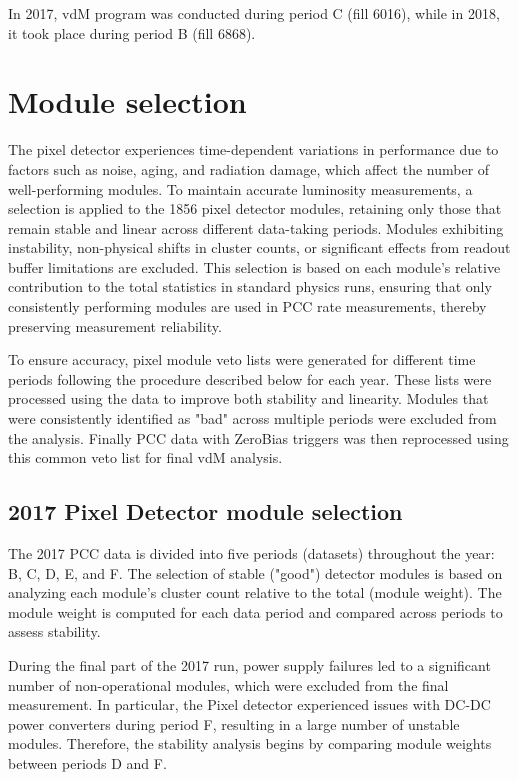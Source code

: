 In 2017, vdM program was conducted during period C (fill 6016), while in 2018, it took place during period B (fill 6868).


\section{Module selection}


The pixel detector experiences time-dependent variations in performance due to factors such as noise, aging, and radiation damage, which affect the number of well-performing modules. To maintain accurate luminosity measurements, a selection is applied to the 1856 pixel detector modules, retaining only those that remain stable and linear across different data-taking periods. Modules exhibiting instability, non-physical shifts in cluster counts, or significant effects from readout buffer limitations are excluded. This selection is based on each module’s relative contribution to the total statistics in standard physics runs, ensuring that only consistently performing modules are used in PCC rate measurements, thereby preserving measurement reliability.

To ensure accuracy, pixel module veto lists were generated for different time periods following the procedure described below for each year. These lists were processed using the data to improve both stability and linearity. Modules that were consistently identified as "bad" across multiple periods were excluded from the analysis. Finally PCC data with ZeroBias triggers was then reprocessed using this common veto list for final vdM analysis.

\subsection{2017 Pixel Detector module selection}
\label{sec:pcc_perf_moduleselection_2017}



The 2017 PCC data is divided into five periods (datasets) throughout the year: B, C, D, E, and F. The selection of stable ("good") detector modules is based on analyzing each module's cluster count relative to the total (module weight). The module weight is computed for each data period and compared across periods to assess stability.

During the final part of the 2017 run, power supply failures led to a significant number of non-operational modules, which were excluded from the final measurement. In particular, the Pixel detector experienced issues with DC-DC power converters during period F, resulting in a large number of unstable modules. Therefore, the stability analysis begins by comparing module weights between periods D and F.

